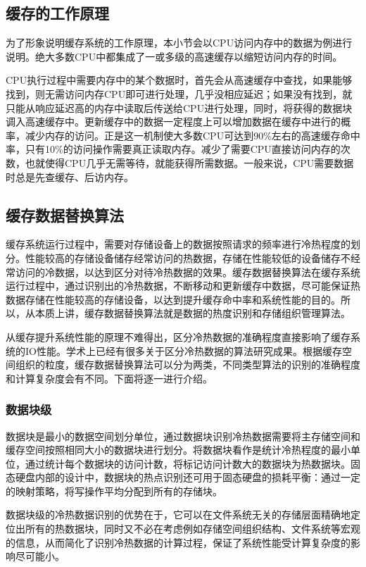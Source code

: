 \subsection{缓存的工作原理}
为了形象说明缓存系统的工作原理，本小节会以CPU访问内存中的数据为例进行说明。绝大多数CPU中都集成了一或多级的高速缓存以缩短访问内存的时间。

CPU执行过程中需要内存中的某个数据时，首先会从高速缓存中查找，如果能够找到，则无需访问内存CPU即可进行处理，几乎没相应延迟；如果没有找到，就只能从响应延迟高的内存中读取后传送给CPU进行处理，同时，将获得的数据块调入高速缓存中。更新缓存中的数据一定程度上可以增加数据在缓存中进行的概率，减少内存的访问。正是这一机制使大多数CPU可达到90\%左右的高速缓存命中率，只有10\%的访问操作需要真正读取内存。减少了需要CPU直接访问内存的次数，也就使得CPU几乎无需等待，就能获得所需数据。一般来说，CPU需要数据时总是先查缓存、后访内存。

\subsection{缓存数据替换算法}
缓存系统运行过程中，需要对存储设备上的数据按照请求的频率进行冷热程度的划分。性能较高的存储设备储存经常访问的热数据，存储在性能较低的设备储存不经常访问的冷数据，以达到区分对待冷热数据的效果。缓存数据替换算法在缓存系统运行过程中，通过识别出的冷热数据，不断移动和更新缓存中数据，尽可能保证热数据存储在性能较高的存储设备，以达到提升缓存命中率和系统性能的目的。所以，从本质上讲，缓存数据替换算法就是数据的热度识别和存储组织管理算法。

从缓存提升系统性能的原理不难得出，区分冷热数据的准确程度直接影响了缓存系统的IO性能。学术上已经有很多关于区分冷热数据的算法研究成果。根据缓存空间组织的粒度，缓存数据替换算法可以分为两类，不同类型算法的识别的准确程度和计算复杂度会有不同。下面将逐一进行介绍。

\subsubsection{数据块级}

数据块是最小的数据空间划分单位，通过数据块识别冷热数据需要将主存储空间和缓存空间按照相同大小的数据块进行划分。将数据块看作是统计冷热程度的最小单位，通过统计每个数据块的访问计数，将标记访问计数大的数据块为热数据块。固态硬盘内部的设计中，数据块的热点识别还可用于固态硬盘的损耗平衡：通过一定的映射策略，将写操作平均分配到所有的存储块。

数据块级的冷热数据识别的优势在于，它可以在文件系统无关的存储层面精确地定位出所有的热数据块，同时又不必在考虑例如存储空间组织结构、文件系统等宏观的信息，从而简化了识别冷热数据的计算过程，保证了系统性能受计算复杂度的影响尽可能小。

